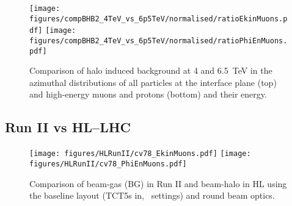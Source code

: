 \begin{figure}
\centering
  \texttt{[image: figures/compBHB2\_4TeV\_vs\_6p5TeV/normalised/ratioEkinMuons.pdf]}
  \texttt{[image: figures/compBHB2\_4TeV\_vs\_6p5TeV/normalised/ratioPhiEnMuons.pdf]}
 \caption{Comparison of halo induced background at 4 and 6.5~TeV in the azimuthal distributions of all particles at the interface plane (top) and high-energy muons and protons (bottom) and their energy.
  \label{compBHB1run1run2}}
\end{figure}




\subsection{Run II vs HL--LHC}

\begin{figure}
\begin{center}
  \texttt{[image: figures/HLRunII/cv78\_EkinMuons.pdf]}
  \texttt{[image: figures/HLRunII/cv78\_PhiEnMuons.pdf]}
\end{center}
\vspace{-0.6cm}
 \caption{Comparison of beam-gas (BG) in Run II and beam-halo in HL using the baseline layout (TCT5s in, \twosigmaret~settings) and round beam optics.
  \label{fig:hlrun2}}
\end{figure}
